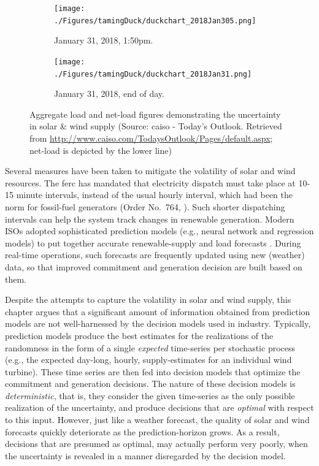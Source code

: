 \begin{figure}[h]
\begin{subfigure}[t]{0.5\textwidth}
\texttt{[image: ./Figures/tamingDuck/duckchart\_2018Jan305.png]}
\caption{January 31, 2018, 1:50pm.}
\end{subfigure}
\begin{subfigure}[t]{0.5\textwidth}
\texttt{[image: ./Figures/tamingDuck/duckchart\_2018Jan31.png]}
\caption{January 31, 2018, end of day.}
\end{subfigure}
\caption{Aggregate load and net-load figures demonstrating the uncertainty in solar \& wind supply (Source: \gls{caiso} - Today's Outlook. Retrieved from \url{http://www.caiso.com/TodaysOutlook/Pages/default.aspx}; net-load is depicted by the lower line)}
\label{ch:td:fig:actual_duckchart_uncertainty}
\end{figure}

Several measures have been taken to mitigate the volatility of solar and wind resources. The \gls{ferc} has mandated that electricity dispatch must take place at 10-15 minute intervals, instead of the usual hourly interval, which had been the norm for fossil-fuel generators (Order No.\ 764, \citealp{FERCOrder}). Such shorter dispatching intervals can help the system track changes in renewable generation. Modern ISOs adopted sophisticated prediction models (e.g., neural network and regression models) to put together accurate renewable-supply and load forecasts \citep[see, for instance,][]{CAISO2017b, NYISO2017}. During real-time operations, such forecasts are frequently updated using new (weather) data, so that improved commitment and generation decision are built based on them. 

Despite the attempts to capture the volatility in solar and wind supply, this chapter argues that a significant amount of information obtained from prediction models are not well-harnessed by the decision models used in industry. Typically, prediction models produce the best estimates for the realizations of the randomness in the form of a single \textit{expected} time-series per stochastic process (e.g., the expected day-long, hourly, supply-estimates for an individual wind turbine). These time series are then fed into decision models that optimize the commitment and generation decisions. The nature of these decision models is \textit{deterministic}, that is, they consider the given time-series as the only possible realization of the uncertainty, and produce decisions that are \textit{optimal} with respect to this input. However, just like a weather forecast, the quality of solar and wind forecasts quickly deteriorate as the prediction-horizon grows. As a result, decisions that are presumed as optimal, may actually perform very poorly, when the uncertainty is revealed in a manner disregarded by the decision model.

